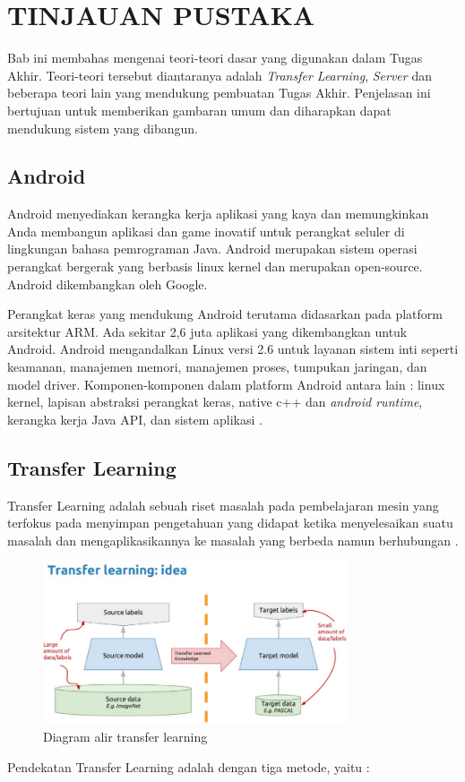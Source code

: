 \chapter {TINJAUAN PUSTAKA}
Bab ini membahas mengenai teori-teori dasar yang digunakan dalam Tugas Akhir. Teori-teori tersebut diantaranya adalah \textit{Transfer Learning}, \textit{Server} dan beberapa teori lain yang mendukung pembuatan Tugas Akhir. Penjelasan ini bertujuan untuk memberikan gambaran umum dan diharapkan dapat mendukung sistem yang dibangun.

\section{Android}
Android menyediakan kerangka kerja aplikasi yang kaya dan memungkinkan Anda membangun aplikasi dan game inovatif untuk perangkat seluler di lingkungan bahasa pemrograman Java.   Android merupakan sistem operasi perangkat bergerak yang berbasis linux kernel dan merupakan open-source. Android dikembangkan oleh Google.

\par Perangkat keras yang mendukung Android terutama didasarkan pada platform arsitektur ARM. Ada sekitar 2,6 juta aplikasi yang dikembangkan untuk Android. Android mengandalkan Linux versi 2.6 untuk layanan sistem inti seperti keamanan, manajemen memori, manajemen proses, tumpukan jaringan, dan model driver. Komponen-komponen dalam platform Android antara lain : linux kernel, lapisan abstraksi perangkat keras, native c++ dan \textit{android runtime}, kerangka kerja Java API, dan sistem aplikasi \cite{android_def}.


\section{Transfer Learning}
\par Transfer Learning adalah sebuah riset masalah pada pembelajaran mesin yang terfokus pada menyimpan pengetahuan yang didapat ketika menyelesaikan suatu masalah dan mengaplikasikannya ke masalah yang berbeda namun berhubungan \cite{transfer_def}. 
\begin{figure}[!ht]
	\centering\includegraphics[width=0.8\textwidth]{bab2/figures/transfer-works.png}
	\caption{Diagram alir transfer learning\cite{transfer_pic}}
	\label{fig:transfer-works}
\end{figure}
\par Pendekatan Transfer Learning adalah dengan tiga metode, yaitu : 


